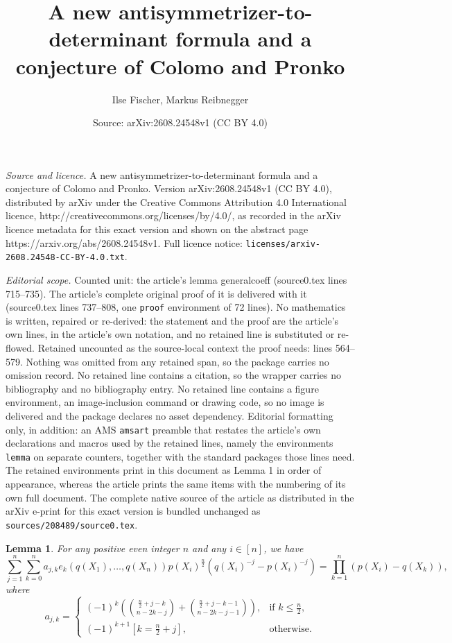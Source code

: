 \documentclass[10pt,a4paper]{amsart}
\title{A new antisymmetrizer-to-determinant formula and a conjecture of Colomo and Pronko}
\author{Ilse Fischer, Markus Reibnegger}
\date{Source: arXiv:2608.24548v1 (CC BY 4.0)}
\newtheorem{lemma}{Lemma}
\begin{document}
\maketitle

\noindent\emph{Source and licence.} A new antisymmetrizer-to-determinant formula and a conjecture of Colomo and Pronko. Version arXiv:2608.24548v1 (CC BY 4.0), distributed by arXiv under the Creative Commons Attribution 4.0 International licence, http://creativecommons.org/licenses/by/4.0/, as recorded in the arXiv licence metadata for this exact version and shown on the abstract page https://arxiv.org/abs/2608.24548v1. Full licence notice: \texttt{licenses/arxiv-2608.24548-CC-BY-4.0.txt}.\par\smallskip

\noindent\textit{Editorial scope.} Counted unit: the article's lemma generalcoeff (source0.tex lines 715--735). The article's complete original proof of it is delivered with it (source0.tex lines 737--808, one \texttt{proof} environment of 72 lines). No mathematics is written, repaired or re-derived: the statement and the proof are the article's own lines, in the article's own notation, and no retained line is substituted or re-flowed.  Retained uncounted as the source-local context the proof needs: lines 564--579.  Nothing was omitted from any retained span, so the package carries no omission record.  No retained line contains a citation, so the wrapper carries no bibliography and no bibliography entry.  No retained line contains a figure environment, an image-inclusion command or drawing code, so no image is delivered and the package declares no asset dependency.  Editorial formatting only, in addition: an AMS \texttt{amsart} preamble that restates the article's own declarations and macros used by the retained lines, namely the environments \texttt{lemma} on separate counters, together with the standard packages those lines need.  The retained environments print in this document as Lemma 1 in order of appearance, whereas the article prints the same items with the numbering of its own full document.  The complete native source of the article as distributed in the arXiv e-print for this exact version is bundled unchanged as \texttt{sources/208489/source0.tex}.
\begin{lemma}
\label{coeffbase}
For any positive even integer $n$ and any $i \in [n]$, we have 
$$
\sum_{j=1}^n \sum_{k=0}^n a_{j,k} e_k(q(X_1),\ldots,q(X_n))p(X_i)^{\frac{n}{2}}(q(X_i)^{-j}-p(X_i)^{-j}) = 
\prod_{k=1}^n (p(X_i) - q(X_k)),
$$ 
where 
$$
a_{j,k} = 
\begin{cases} (-1)^k \left( \binom{\frac{n}{2}+j-k}{n-2k-j} + \binom{\frac{n}{2}+j-k-1}{n-2k-j-1}\right), & \text{if 
$k \le \frac{n}{2}$}, \\
                       (-1)^{k+1} \left[k=\frac{n}{2}+j\right], & \text{otherwise}.
\end{cases} 
$$    
\end{lemma} 
\end{document}
